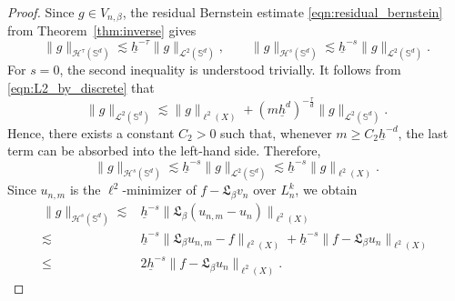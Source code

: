 \documentclass{article}
\numberwithin{equation}{section}
\def\SS{\mathbb{S}}
\begin{document}
\begin{proof}
\medskip
Since $g\in V_{n,\beta}$, the residual Bernstein estimate \eqref{eqn:residual_bernstein} from Theorem~\ref{thm:inverse} gives
\begin{equation}\label{eqn:residual_bernstein_used}
    \|g\|_{\mathcal H^\tau(\SS^d)}
    \lesssim\underline h^{-\tau}\|g\|_{\mathcal L^2(\SS^d)},
    \qquad
    \|g\|_{\mathcal H^s(\SS^d)}
    \lesssim\underline h^{-s}\|g\|_{\mathcal L^2(\SS^d)}.
\end{equation}
For $s=0$, the second inequality is understood trivially. It follows from \eqref{eqn:L2_by_discrete} that
\begin{equation*}
    \|g\|_{\mathcal L^2(\SS^d)}
    \lesssim\|g\|_{\ell^2(X)}
    +(m\underline h^d)^{-\frac{\tau}{d}}\|g\|_{\mathcal L^2(\SS^d)}.
\end{equation*}
Hence, there exists a constant $C_2>0$ such that, whenever $m\geq C_2\underline h^{-d}$, the last term can be absorbed into the left-hand side. Therefore,
\begin{equation}\label{eqn:residual_stability}
    \|g\|_{\mathcal H^s(\SS^d)}
    \lesssim\underline h^{-s}\|g\|_{\mathcal L^2(\SS^d)}
    \lesssim\underline h^{-s}\|g\|_{\ell^2(X)}.
\end{equation}
Since $u_{n,m}$ is the $\ell^2$-minimizer of $f-\mathfrak L_\beta v_n$ over $L_n^k$, we obtain
\begin{equation}\label{eqn:error_decom2}
    \begin{split}
        \|g\|_{\mathcal H^s(\SS^d)}
        \lesssim&\underline h^{-s}\|\mathfrak L_\beta(u_{n,m}-u_n)\|_{\ell^2(X)}\\
        \lesssim&\underline h^{-s}\|\mathfrak L_\beta u_{n,m}-f\|_{\ell^2(X)}
        +\underline h^{-s}\|f-\mathfrak L_\beta u_n\|_{\ell^2(X)}\\
        \leq&2\underline h^{-s}\|f-\mathfrak L_\beta u_n\|_{\ell^2(X)}.
    \end{split}
\end{equation}


\end{proof}
\end{document}
